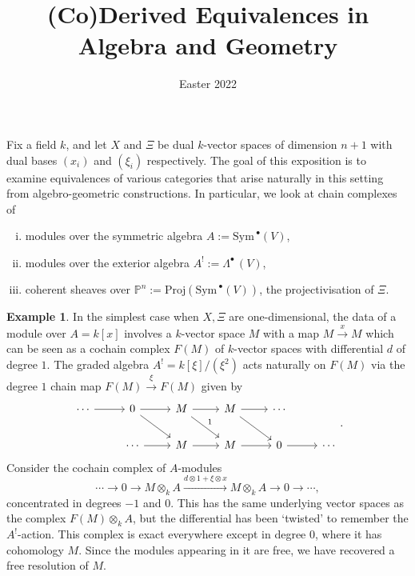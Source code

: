 \documentclass[a4paper]{article}
\title{(Co)Derived Equivalences in Algebra and Geometry}
\date{\vspace{-2.5em} Easter 2022}
\theoremstyle{definition}
\newtheorem{example}[defn]{Example}
\theoremstyle{remark}
\newcommand{\Sym}{\ensuremath{\text{Sym}\,}}
\newcommand{\exterior}{\ensuremath{\Lambda^\bullet\,}}
\newcommand{\Proj}{\ensuremath{\text{Proj}}}
\newcommand{\Pn}{\ensuremath{\mathbb{P}^n}}
\begin{document}
 


\maketitle
\tableofcontents 

\vspace{1em}

Fix a field \(k\), and let \(X\) and \(\Xi\) be dual \(k\)-vector spaces of
dimension \(n+1\) with dual bases \((x_i)\) and \((\xi_i)\) respectively. The goal
of this exposition is to examine equivalences of various categories that arise
naturally in this setting from algebro-geometric constructions. In particular,
we look at chain complexes of 
\begin{enumerate}[(i)]
    \item modules over the symmetric algebra \(A:=
        \Sym^\bullet(V)\),
    \item modules over the exterior algebra \(A^!:= \exterior(V)\),
    \item coherent sheaves over \(\Pn := \Proj(\Sym^\bullet (V))\), the
        projectivisation of \(\Xi\).
\end{enumerate}

\begin{example}\label{setstage}
In the simplest case when \(X, \Xi\) are one-dimensional, the data of a module
over \(A = k[x]\) involves a \(k\)-vector space \(M\) with a map
\(M\xrightarrow{x} M\) which can be seen as a cochain complex \(F(M)\) of
\(k\)-vector spaces with differential \(d\) of degree \(1\). The graded algebra
\(A^! = k[\xi]/(\xi^2)\) acts naturally on \(F(M)\) via the degree \(1\)
chain map \(F(M)\xrightarrow{\xi} F(M)\) given by
\[\begin{tikzcd}
    \cdots \arrow[r] & 0 \arrow[r] \arrow[rd] & M \arrow[r] \arrow[rd, "1"] & M
    \arrow[r] \arrow[rd] & \cdots &   \\ & \cdots \arrow[r] & M \arrow[r] & M
    \arrow[r] & 0 \arrow[r] & \cdots
\end{tikzcd}.\]
Consider the cochain complex of \(A\)-modules
\[\cdots \rightarrow 0 \rightarrow M\otimes_k A
\xrightarrow{ d\otimes 1 + \xi \otimes x} M\otimes_k A \rightarrow 0 \rightarrow
\cdots ,\]
concentrated in degrees \(-1\) and \(0\). This has the same underlying vector
spaces as the complex \(F(M)\otimes_k A\), but the differential has been
`twisted' to remember the \(A^!\)-action. This complex is exact everywhere
except in degree \(0\), where it has cohomology \(M\). Since the modules
appearing in it are free, we have recovered a free resolution of \(M\). 
\end{example}
\end{document}
